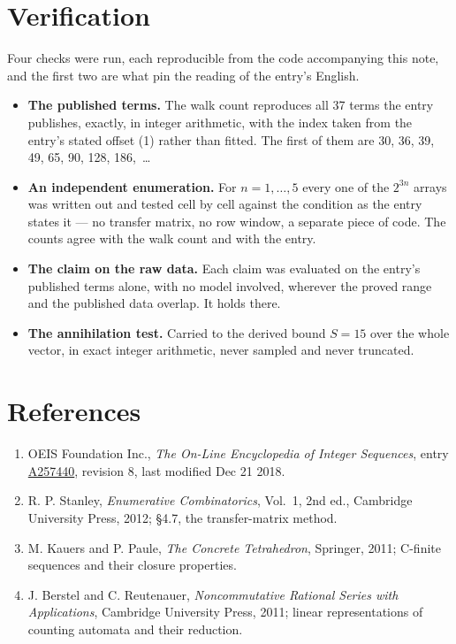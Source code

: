 \documentclass[11pt]{article}
\theoremstyle{definition}
\begin{document}
\section{Verification}

Four checks were run, each reproducible from the code accompanying this note, and the first two are what pin the reading of the entry's English.

\begin{itemize}

\item {\bfseries The published terms.} The walk count reproduces all 37 terms the entry publishes, exactly, in integer arithmetic, with the index taken from the entry's stated offset (1) rather than fitted. The first of them are 30, 36, 39, 49, 65, 90, 128, 186,~\dots

\item {\bfseries An independent enumeration.} For $n = 1,\dots,5$ every one of the $2^{3n}$ arrays was written out and tested cell by cell against the condition as the entry states it --- no transfer matrix, no row window, a separate piece of code. The counts agree with the walk count and with the entry.

\item {\bfseries The claim on the raw data.} Each claim was evaluated on the entry's published terms alone, with no model involved, wherever the proved range and the published data overlap. It holds there.

\item {\bfseries The annihilation test.} Carried to the derived bound $S = 15$ over the whole vector, in exact integer arithmetic, never sampled and never truncated.

\end{itemize}

\section{References}

\begin{enumerate}

\item OEIS Foundation Inc., \emph{The On-Line Encyclopedia of Integer Sequences}, entry \href{https://oeis.org/A257440}{A257440}, revision 8, last modified Dec 21 2018.

\item R. P. Stanley, \emph{Enumerative Combinatorics}, Vol.~1, 2nd ed., Cambridge University Press, 2012; \S4.7, the transfer-matrix method.

\item M. Kauers and P. Paule, \emph{The Concrete Tetrahedron}, Springer, 2011; C-finite sequences and their closure properties.

\item J. Berstel and C. Reutenauer, \emph{Noncommutative Rational Series with Applications}, Cambridge University Press, 2011; linear representations of counting automata and their reduction.

\end{enumerate}
\end{document}
